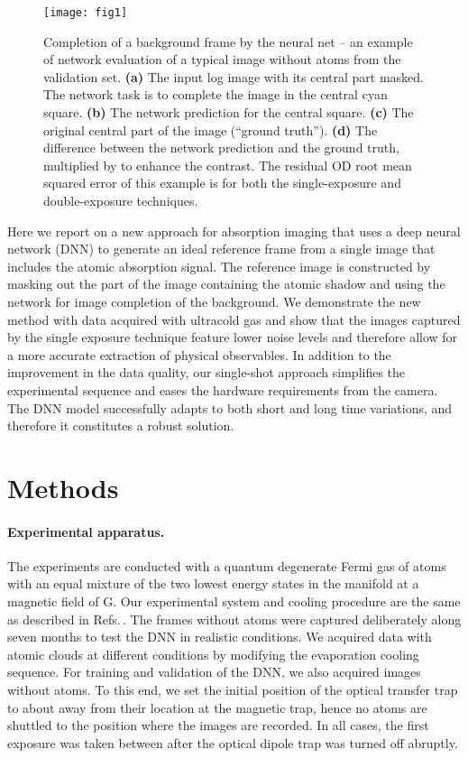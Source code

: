 \documentclass[twocolumn,groupedaddress,longbibliography]{revtex4-1}
\begin{document}
\begin{figure*}
\centering
\texttt{[image: fig1]}
\caption{Completion of a background frame by the neural net -- an example of network evaluation of a typical image without atoms from the validation set.
	\textbf{(a)} The input log image with its central part masked. The network task is to complete the image in the central cyan square.
	\textbf{(b)} The network prediction for the central square.
	\textbf{(c)} The original central part of the image (``ground truth'').
	\textbf{(d)} The difference between the network prediction and the ground truth, multiplied by  to enhance the contrast. The residual OD root mean squared error of this example is  for both the single-exposure and double-exposure techniques.
}
\label{fig:no_atoms}
\end{figure*}

Here we report on a new approach for absorption imaging that uses a deep neural network (DNN) to generate an ideal reference frame from a single image that includes the atomic absorption signal. The reference image is constructed by masking out the part of the image containing the atomic shadow and using the network for image completion of the background. We demonstrate the new method with data acquired with ultracold  gas and show that the images captured by the single exposure technique feature lower noise levels and therefore allow for a more accurate extraction of physical observables. In addition to the improvement in the data quality, our single-shot approach simplifies the experimental sequence and eases the hardware requirements from the camera. The DNN model successfully adapts to both short and long time variations, and therefore it constitutes a robust solution.


\section{Methods}

\paragraph*{Experimental apparatus.}

The experiments are conducted with a quantum degenerate Fermi gas of  atoms with an equal mixture of the two lowest energy states in the  manifold at a magnetic field of G. Our experimental system and cooling procedure are the same as described in Refs.\,\cite{Shkedrov2018,Ness2018}. The frames without atoms were captured deliberately along seven months to test the DNN in realistic conditions. We acquired data with atomic clouds at different conditions by modifying the evaporation cooling sequence. For training and validation of the DNN, we also acquired images without atoms. To this end, we set the initial position of the optical transfer trap to about  away from their location at the magnetic trap, hence no atoms are shuttled to the position where the images are recorded. In all cases, the first exposure was taken between  after the optical dipole trap was turned off abruptly.
\end{document}
